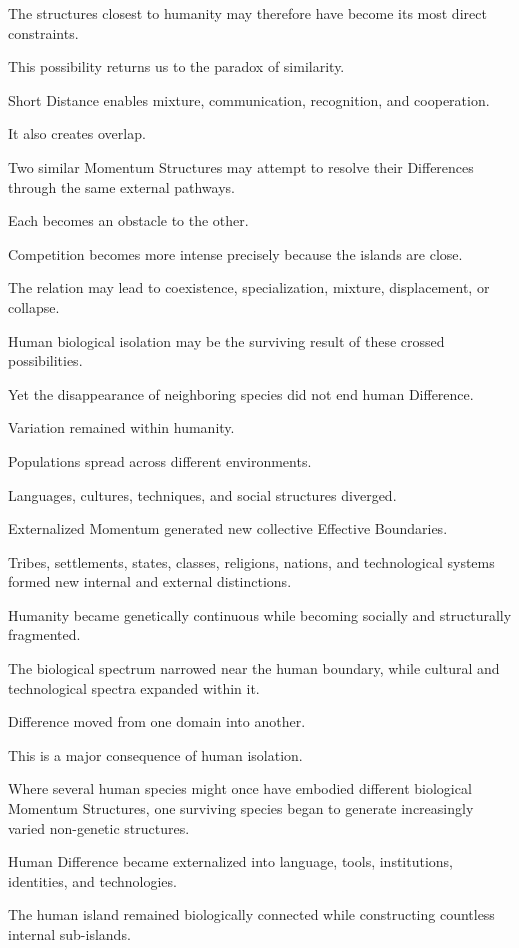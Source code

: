 The structures closest to humanity may therefore have become its most direct constraints.

This possibility returns us to the paradox of similarity.

Short Distance enables mixture, communication, recognition, and cooperation.

It also creates overlap.

Two similar Momentum Structures may attempt to resolve their Differences through the same external pathways.

Each becomes an obstacle to the other.

Competition becomes more intense precisely because the islands are close.

The relation may lead to coexistence, specialization, mixture, displacement, or collapse.

Human biological isolation may be the surviving result of these crossed possibilities.

Yet the disappearance of neighboring species did not end human Difference.

Variation remained within humanity.

Populations spread across different environments.

Languages, cultures, techniques, and social structures diverged.

Externalized Momentum generated new collective Effective Boundaries.

Tribes, settlements, states, classes, religions, nations, and technological systems formed new internal and external distinctions.

Humanity became genetically continuous while becoming socially and structurally fragmented.

The biological spectrum narrowed near the human boundary, while cultural and technological spectra expanded within it.

Difference moved from one domain into another.

This is a major consequence of human isolation.

Where several human species might once have embodied different biological Momentum Structures, one surviving species began to generate increasingly varied non-genetic structures.

Human Difference became externalized into language, tools, institutions, identities, and technologies.

The human island remained biologically connected while constructing countless internal sub-islands.

